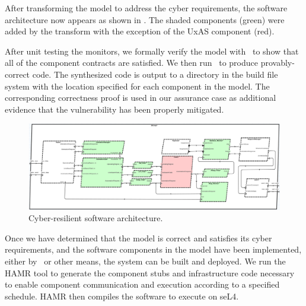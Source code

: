After transforming the model to address the cyber requirements, the software architecture now appears as shown in .  The shaded components (green) were added by the transform with the exception of the UxAS component (red). 

After unit testing the monitors, we formally verify the model with \agr\ to show that all of the component contracts are satisfied.
We then run \splt\ to produce provably-correct code.
The synthesized code is output to a directory in the build file system with the location specified for each component in the model.  The corresponding correctness proof is used in our assurance case as additional evidence that the vulnerability has been properly mitigated.

\begin{figure}[h]
	\centering
	\includegraphics[width=2\columnwidth]{figs/hardened-sw.png}
	\caption{Cyber-resilient software architecture.}
	\label{fig:hardened-sw}
\end{figure}

Once we have determined that the model is correct and satisfies its cyber requirements, and the software components in the model have been implemented, either by \splt\ or other means, the system can be built and deployed.  We run the HAMR tool to generate the component stubs and infrastructure code necessary to enable component communication and execution according to a specified schedule.
%
HAMR then compiles the software to execute on seL4.

